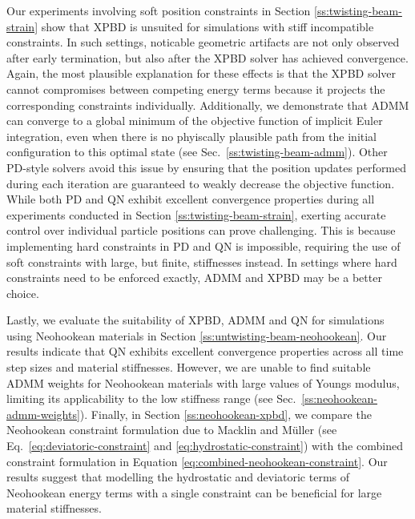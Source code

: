 Our experiments involving soft position constraints in Section \ref{ss:twisting-beam-strain} show that XPBD is unsuited for simulations with stiff incompatible constraints. 
In such settings, noticable geometric artifacts are not only observed after early termination, but also after the XPBD solver has achieved convergence. Again, the most plausible 
explanation for these effects is that the XPBD solver cannot compromises between competing energy terms because it projects the corresponding constraints individually. 
Additionally, we demonstrate that ADMM can converge to a global minimum of the objective function of implicit Euler integration, even when there is no 
phyiscally plausible path from the initial configuration to this optimal state (see Sec.\ \ref{ss:twisting-beam-admm}). Other PD-style solvers avoid this issue by ensuring 
that the position updates performed during each iteration are guaranteed to weakly decrease the objective function. While both PD and QN exhibit excellent convergence properties 
during all experiments conducted in Section \ref{ss:twisting-beam-strain}, exerting accurate control over individual particle positions can prove challenging. 
This is because implementing hard constraints in PD and QN is impossible, requiring the use of soft constraints with large, but finite, stiffnesses instead.
In settings where hard constraints need to be enforced exactly, ADMM and XPBD may be a better choice.

Lastly, we evaluate the suitability of XPBD, ADMM and QN for simulations using Neohookean materials in Section \ref{ss:untwisting-beam-neohookean}. Our results indicate that QN 
exhibits excellent convergence properties across all time step sizes and material stiffnesses. However, we are unable to find suitable ADMM weights for Neohookean materials 
with large values of Youngs modulus, limiting its applicability to the low stiffness range (see Sec.\ \ref{ss:neohookean-admm-weights}). Finally, in Section \ref{ss:neohookean-xpbd}, 
we compare the Neohookean constraint formulation due to Macklin and Müller \cite{macklin2021} (see Eq.\ \ref{eq:deviatoric-constraint} and \ref{eq:hydrostatic-constraint}) 
with the combined constraint formulation in Equation \ref{eq:combined-neohookean-constraint}. Our results suggest that modelling the hydrostatic and deviatoric 
terms of Neohookean energy terms with a single constraint can be beneficial for large material stiffnesses.
